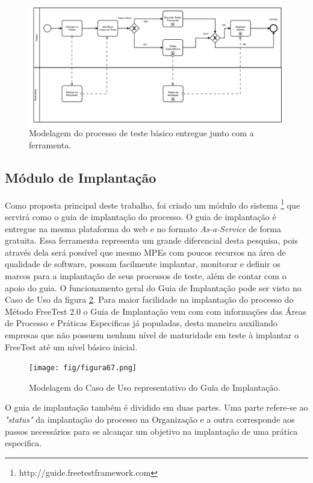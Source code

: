 \begin{figure}[H]
\centering
\includegraphics[width=.90\textwidth]{fig/figura66.png}
\caption{Modelagem do processo de teste básico entregue junto com a ferramenta.}
\label{fig:fig66}
\end{figure}

\subsection{Módulo de Implantação}
\label{sec:oguiadeimplantacao}

Como proposta principal deste trabalho, foi criado um módulo do sistema \footnote{http://guide.freetestframework.com} que servirá como o guia de implantação do processo. O guia de implantação é entregue na mesma plataforma do web e no formato \textit{As-a-Service} de forma gratuita. Essa ferramenta representa um grande diferencial desta pesquisa, pois através dela será possível que mesmo MPEs com poucos recursos na área de qualidade de software, possam facilmente implantar, monitorar e definir os marcos para a implantação de seus processos de teste, além de contar com o apoio do guia. O funcionamento geral do Guia de Implantação pode ser visto no Caso de Uso da figura \ref{fig:fig67}. Para maior facilidade na implantação do processo do Método FreeTest 2.0 o Guia de Implantação vem com com informações das Áreas de Processo e Práticas Especificas já populadas, desta maneira auxiliando empresas que não possuem nenhum nível de maturidade em teste à implantar o FreeTest até um nível básico inicial.

\begin{figure}[H]
\centering
\texttt{[image: fig/figura67.png]}
\caption{Modelagem do Caso de Uso representativo do Guia de Implantação.}
\label{fig:fig67}
\end{figure}

O guia de implantação também é dividido em duas partes. Uma parte refere-se ao \textit{"status"} da implantação do processo na Organização e a outra corresponde aos passos necessários para se alcançar um objetivo na implantação de uma prática especifica.

